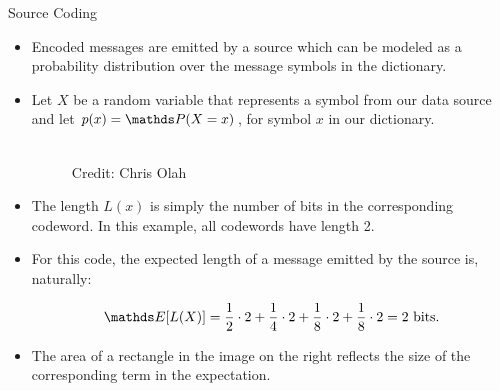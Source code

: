 \begin{vbframe} {Source Coding}
\begin{itemize}
  \item Encoded messages are emitted by a source which can be modeled as a probability distribution over the message symbols in the dictionary. 
  \item Let $X$ be a random variable that represents a symbol from our data source and let $p(x) = \P(X = x)$, for symbol $x$ in our dictionary.
  \begin{figure}
    \centering
      \tiny{\\ Credit: Chris Olah}
  \end{figure}
  \item The length $L(x)$ is simply the number of bits in the corresponding codeword. In this example, all codewords have length 2.
\end{itemize}
\framebreak

  \begin{figure}
    \centering
  \end{figure}
  
  \begin{itemize}
    \item For this code, the expected length of a message emitted by the source is, naturally:

      $$\E[L(X)] = \frac{1}{2} \cdot 2 + \frac{1}{4} \cdot 2 + \frac{1}{8} \cdot 2 + \frac{1}{8} \cdot 2 = 2 \text{ bits.}$$

    \item The area of a rectangle in the image on the right reflects the size of the corresponding term in the expectation.


\end{itemize}
\end{vbframe}
